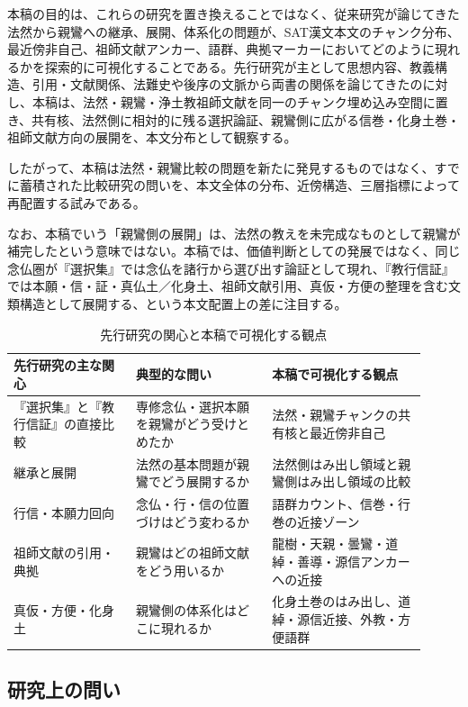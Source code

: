 \documentclass[uplatex,dvipdfmx,11pt,a4paper]{jsarticle}
\begin{document}
本稿の目的は、これらの研究を置き換えることではなく、従来研究が論じてきた法然から親鸞への継承、展開、体系化の問題が、SAT漢文本文のチャンク分布、最近傍非自己、祖師文献アンカー、語群、典拠マーカーにおいてどのように現れるかを探索的に可視化することである。先行研究が主として思想内容、教義構造、引用・文献関係、法難史や後序の文脈から両書の関係を論じてきたのに対し、本稿は、法然・親鸞・浄土教祖師文献を同一のチャンク埋め込み空間に置き、共有核、法然側に相対的に残る選択論証、親鸞側に広がる信巻・化身土巻・祖師文献方向の展開を、本文分布として観察する。

したがって、本稿は法然・親鸞比較の問題を新たに発見するものではなく、すでに蓄積された比較研究の問いを、本文全体の分布、近傍構造、三層指標によって再配置する試みである。

なお、本稿でいう「親鸞側の展開」は、法然の教えを未完成なものとして親鸞が補完したという意味ではない。本稿では、価値判断としての発展ではなく、同じ念仏圏が『選択集』では念仏を諸行から選び出す論証として現れ、『教行信証』では本願・信・証・真仏土／化身土、祖師文献引用、真仮・方便の整理を含む文類構造として展開する、という本文配置上の差に注目する。

\begin{table}[H]
\centering
\small
\caption{先行研究の関心と本稿で可視化する観点}
\label{tab:prior-research-positioning}
\begin{tabular}{@{}p{0.27\linewidth}p{0.30\linewidth}p{0.34\linewidth}@{}}
\toprule
先行研究の主な関心 & 典型的な問い & 本稿で可視化する観点 \\
\midrule
『選択集』と『教行信証』の直接比較 & 専修念仏・選択本願を親鸞がどう受けとめたか & 法然・親鸞チャンクの共有核と最近傍非自己 \\
継承と展開 & 法然の基本問題が親鸞でどう展開するか & 法然側はみ出し領域と親鸞側はみ出し領域の比較 \\
行信・本願力回向 & 念仏・行・信の位置づけはどう変わるか & 語群カウント、信巻・行巻の近接ゾーン \\
祖師文献の引用・典拠 & 親鸞はどの祖師文献をどう用いるか & 龍樹・天親・曇鸞・道綽・善導・源信アンカーへの近接 \\
真仮・方便・化身土 & 親鸞側の体系化はどこに現れるか & 化身土巻のはみ出し、道綽・源信近接、外教・方便語群 \\
\bottomrule
\end{tabular}
\end{table}

\subsection{研究上の問い}
\end{document}
